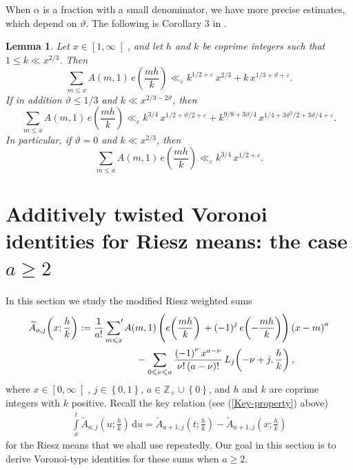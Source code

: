 \documentclass[a4paper,10pt,twoside]{amsart}
\newtheorem{lemma}[theorem]{Lemma}
\theoremstyle{definition}
\numberwithin{equation}{section}
\newcommand\eps{\varepsilon}
\renewcommand\:{\colon}
\newcommand{\sump}{\mathop{{\sum}^{\raisebox{-3pt}{\makebox[0pt][l]{$'$}}}}}
\begin{document}
\noindent When $\alpha$ is a fraction with a small denominator, we have more precise estimates, which depend on $\vartheta$. The following is Corollary 3 in \cite{Jaasaari--Vesalainen1}.
\begin{lemma}\label{corollary3}
Let $x\in\left[1,\infty\right[$, and let $h$ and $k$ be coprime integers such that $1\leqslant k\ll x^{2/3}$. Then
\[\sum_{m\leqslant x}A(m,1)\,e\!\left(\frac{mh}k\right)\ll_\eps k^{1/2+\varepsilon}\,x^{2/3}+k\,x^{1/3+\vartheta+\varepsilon}.\]
If in addition $\vartheta\leqslant1/3$ and $k\ll x^{2/3-2\vartheta}$, then
\[\sum_{m\leqslant x}A(m,1)\,e\!\left(\frac{mh}k\right)\ll_\eps k^{3/4}\,x^{1/2+\vartheta/2+\varepsilon}+k^{9/8+3\vartheta/4}\,x^{1/4+3\vartheta^2/2+3\vartheta/4+\varepsilon}.\]
In particular, if $\vartheta=0$ and $k\ll x^{2/3}$, then
\[\sum_{m\leqslant x}A(m,1)\,e\!\left(\frac{mh}k\right)\ll_\eps k^{3/4}\,x^{1/2+\varepsilon}.\]
\end{lemma}



\section{Additively twisted Voronoi identities for Riesz means: the case $a\geqslant2$}

\noindent In this section  we study the modified Riesz weighted sums
\begin{align*}
\widetilde A_{a,j}\!\left(x;\frac hk\right)&:=\frac1{a!}\sump_{m\leqslant x}A(m,1)\left(e\!\left(\frac{mh}k\right)\vphantom{\Bigg|}+\left(-1\right)^je\!\left(-\frac{mh}k\right)\right)\left(x-m\right)^a\\
&\qquad\qquad\qquad-\sum_{0\leqslant\nu\leqslant a}\frac{\left(-1\right)^\nu x^{a-\nu}}{\nu!\left(a-\nu\right)!}\,L_j\!\left(-\nu+j,\frac hk\right),
\end{align*}
where $x\in\left[0,\infty\right[$, $j\in\left\{0,1\right\}$, $a\in\mathbb Z_+\cup\left\{0\right\}$, and $h$ and $k$ are coprime integers with $k$ positive. Recall the key relation (see (\ref{Key-property}) above)
\begin{align*}
\int\limits_x^t \widetilde A_{a,j}\left(u;\frac hk\right)\,\mathrm d u=\widetilde A_{a+1,j}\left(t;\frac hk\right)-\widetilde A_{a+1,j}\left(x;\frac hk\right)
\end{align*}
for the Riesz means that we shall use repeatedly. Our goal in this section is to derive Voronoi-type identities for these sums when $a\geqslant2$.
\end{document}
